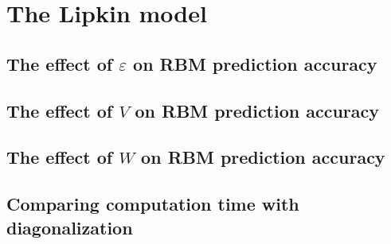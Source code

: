 \section{The Lipkin model}
\subsection{The effect of \texorpdfstring{$\varepsilon$}{epsilon} on RBM prediction accuracy}
\subsection{The effect of \texorpdfstring{$V$}{V} on RBM prediction accuracy}
\subsection{The effect of \texorpdfstring{$W$}{W} on RBM prediction accuracy}
\subsection{Comparing computation time with diagonalization}

